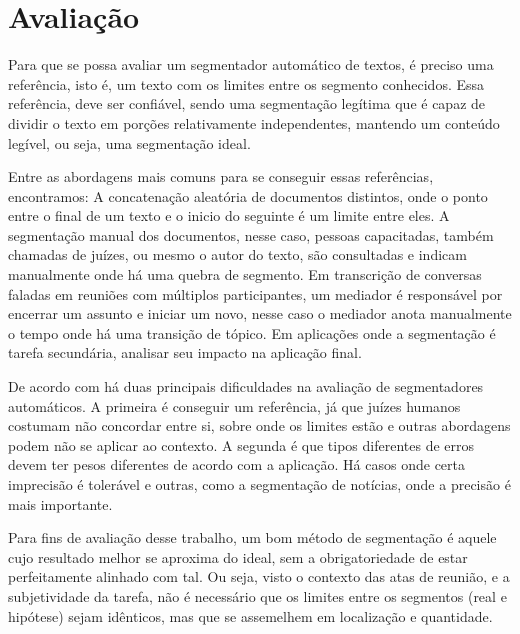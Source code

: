 
\section{Avaliação}
	\label{sec:avaliacao}



Para que se possa avaliar um segmentador automático de textos, é preciso uma referência, isto é, um texto com os limites entre os segmento conhecidos. Essa referência, deve ser confiável, sendo uma segmentação legítima que é capaz de dividir o texto em porções relativamente independentes, mantendo um conteúdo legível, ou seja, uma segmentação ideal.
%

Entre as abordagens mais comuns para se conseguir essas referências, encontramos: A concatenação aleatória de documentos distintos, onde o ponto entre o final de um texto e o inicio do seguinte é um limite entre eles. A segmentação manual dos documentos, nesse caso, pessoas capacitadas, também chamadas de juízes, ou mesmo o autor do texto, são consultadas e indicam manualmente onde há uma quebra de segmento. Em transcrição de conversas faladas em reuniões com múltiplos participantes, um mediador é responsável por encerrar um assunto e iniciar um novo, nesse caso o mediador anota manualmente o tempo onde há uma transição de tópico. Em aplicações onde a segmentação é tarefa secundária, analisar seu impacto na aplicação final.


De acordo com \cite{fulano} há duas principais dificuldades na avaliação de segmentadores automáticos. A primeira é conseguir um referência, já que juízes humanos costumam não concordar entre si, sobre onde os limites estão e outras abordagens podem não se aplicar ao contexto. A segunda é que tipos diferentes de erros devem ter pesos diferentes de acordo com a aplicação. Há casos onde certa imprecisão é tolerável e outras, como a segmentação de notícias, onde a precisão é mais importante.


Para fins de avaliação desse trabalho, um bom método de segmentação é aquele cujo resultado melhor se aproxima do ideal, sem a obrigatoriedade de estar perfeitamente alinhado com tal. Ou seja, visto o contexto das atas de reunião, e a subjetividade da tarefa, não é necessário que os limites entre os segmentos (real e hipótese) sejam idênticos, mas que se assemelhem em localização e quantidade.


